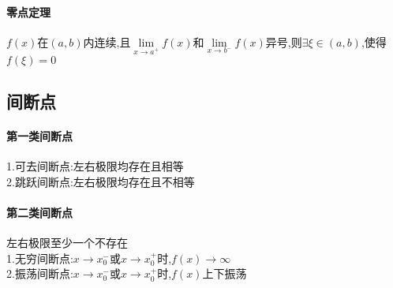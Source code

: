 \documentclass{article}
\begin{document}
\begin{flushleft}
	\paragraph{零点定理}
	$f(x)$在$(a,b)$内连续,且$\lim\limits_{x\to a^+} f(x)$和$\lim\limits_{x\to b^-} f(x)$异号,则$\exists \xi \in (a,b)$,使得$f(\xi)=0$\\
	
	\subsection{间断点}
	
	\paragraph{第一类间断点}
	1.可去间断点:左右极限均存在且相等\\
	2.跳跃间断点:左右极限均存在且不相等\\
	\paragraph{第二类间断点}
	左右极限至少一个不存在\\
	1.无穷间断点:$x\to x_0^-$或$x\to x_0^+$时,$f(x)\to \infty$\\
	2.振荡间断点:$x\to x_0^-$或$x\to x_0^+$时,$f(x)$上下振荡\\

\end{flushleft}
\end{document}
